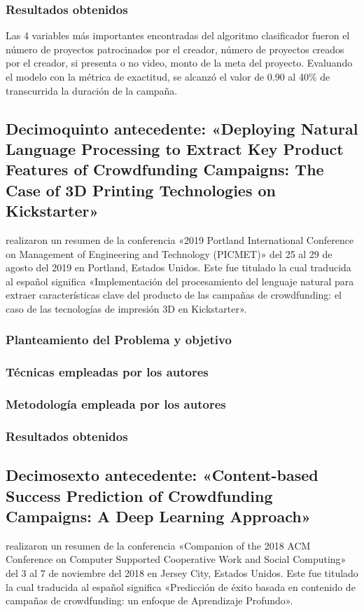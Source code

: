 \subsubsection{Resultados obtenidos}
Las 4 variables más importantes encontradas del algoritmo clasificador fueron el número de proyectos patrocinados por el creador, número de proyectos creados por el creador, si presenta o no video, monto de la meta del proyecto. Evaluando el modelo con la métrica de exactitud, se alcanzó el valor de 0.90 al 40\% de transcurrida la duración de la campaña.

\subsection{Decimoquinto antecedente: «Deploying Natural Language Processing to Extract Key Product Features of Crowdfunding Campaigns: The Case of 3D Printing Technologies on Kickstarter» \citep*{pr_chaichi2019nlp_3dprinting}}
\citeauthor{pr_chaichi2019nlp_3dprinting} realizaron un resumen de la conferencia «2019 Portland International Conference on Management of Engineering and Technology (PICMET)» del 25 al 29 de agosto del 2019 en Portland, Estados Unidos. Este fue titulado  la cual traducida al español significa «Implementación del procesamiento del lenguaje natural para extraer características clave del producto de las campañas de crowdfunding: el caso de las tecnologías de impresión 3D en Kickstarter».

\subsubsection{Planteamiento del Problema y objetivo}


\subsubsection{Técnicas empleadas por los autores}

\subsubsection{Metodología empleada por los autores}

\subsubsection{Resultados obtenidos}

\subsection{Decimosexto antecedente: «Content-based Success Prediction of Crowdfunding Campaigns: A Deep	Learning Approach» \citep*{pr_lee2018contentDL}}
\citeauthor{pr_lee2018contentDL} realizaron un resumen de la conferencia «Companion of the 2018 ACM Conference on Computer Supported Cooperative Work and Social Computing» del 3 al 7 de noviembre del 2018 en Jersey City, Estados Unidos. Este fue titulado  la cual traducida al español significa «Predicción de éxito basada en contenido de campañas de crowdfunding: un enfoque de Aprendizaje Profundo».

